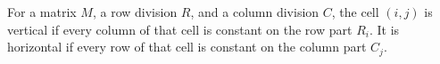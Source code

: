 For a matrix \(M\), a row division \(R\), and a column division \(C\), the
cell \((i,j)\) is vertical if every column of that cell is constant on the
row part \(R_i\).  It is horizontal if every row of that cell is constant on
the column part \(C_j\).
